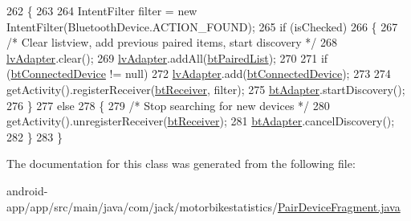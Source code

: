 \begin{DoxyCode}
262                                                                                    \{
263 
264             IntentFilter filter = \textcolor{keyword}{new} IntentFilter(BluetoothDevice.ACTION\_FOUND);
265             \textcolor{keywordflow}{if} (isChecked)
266             \{
267                 \textcolor{comment}{/* Clear listview, add previous paired items, start discovery */}
268                 \hyperlink{classcom_1_1jack_1_1motorbikestatistics_1_1_pair_device_fragment_a5ab5efcda2c2fe8db4420ec28ea2840f}{lvAdapter}.clear();
269                 \hyperlink{classcom_1_1jack_1_1motorbikestatistics_1_1_pair_device_fragment_a5ab5efcda2c2fe8db4420ec28ea2840f}{lvAdapter}.addAll(\hyperlink{classcom_1_1jack_1_1motorbikestatistics_1_1_pair_device_fragment_aace08948a2a397e9f724cfbf12256cfa}{btPairedList});
270 
271                 \textcolor{keywordflow}{if} (\hyperlink{classcom_1_1jack_1_1motorbikestatistics_1_1_pair_device_fragment_afb95960b8365f4696444ea7683ebbf93}{btConnectedDevice} != null)
272                     \hyperlink{classcom_1_1jack_1_1motorbikestatistics_1_1_pair_device_fragment_a5ab5efcda2c2fe8db4420ec28ea2840f}{lvAdapter}.add(\hyperlink{classcom_1_1jack_1_1motorbikestatistics_1_1_pair_device_fragment_afb95960b8365f4696444ea7683ebbf93}{btConnectedDevice});
273 
274                 getActivity().registerReceiver(\hyperlink{classcom_1_1jack_1_1motorbikestatistics_1_1_pair_device_fragment_a6403005fa23383ae6a44576b83bd6681}{btReceiver}, filter);
275                 \hyperlink{classcom_1_1jack_1_1motorbikestatistics_1_1_pair_device_fragment_ac21b65a91245ae03ebba675e41166ace}{btAdapter}.startDiscovery();
276             \}
277             \textcolor{keywordflow}{else}
278             \{
279                 \textcolor{comment}{/* Stop searching for new devices */}
280                 getActivity().unregisterReceiver(\hyperlink{classcom_1_1jack_1_1motorbikestatistics_1_1_pair_device_fragment_a6403005fa23383ae6a44576b83bd6681}{btReceiver});
281                 \hyperlink{classcom_1_1jack_1_1motorbikestatistics_1_1_pair_device_fragment_ac21b65a91245ae03ebba675e41166ace}{btAdapter}.cancelDiscovery();
282             \}
283         \}
\end{DoxyCode}


The documentation for this class was generated from the following file\+:\begin{DoxyCompactItemize}
\item 
android-\/app/app/src/main/java/com/jack/motorbikestatistics/\hyperlink{_pair_device_fragment_8java}{Pair\+Device\+Fragment.\+java}\end{DoxyCompactItemize}
